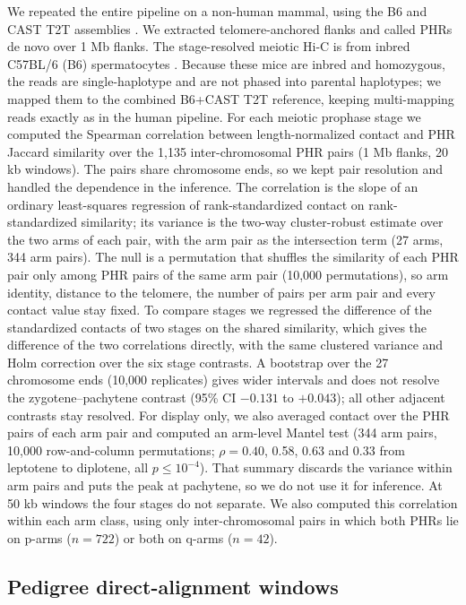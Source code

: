 \documentclass[pdflatex,mathphys]{jnl}
\begin{document}
We repeated the entire pipeline on a non-human mammal, using the B6 and CAST T2T
assemblies \cite{Francis2025}. We extracted telomere-anchored flanks and called PHRs de novo over 1 Mb flanks. The stage-resolved
meiotic Hi-C is from inbred C57BL/6 (B6) spermatocytes \cite{Zuo2021}. Because
these mice are inbred and homozygous, the reads are single-haplotype and are not
phased into parental haplotypes; we mapped them to the combined B6+CAST T2T
reference, keeping multi-mapping reads exactly as in the human pipeline. For each meiotic
prophase stage we computed the Spearman correlation between length-normalized contact and
PHR Jaccard similarity over the 1{,}135 inter-chromosomal PHR pairs (1 Mb flanks, 20 kb
windows). The pairs share chromosome ends, so we kept pair resolution and handled the
dependence in the inference. The correlation is the slope of an ordinary least-squares
regression of rank-standardized contact on rank-standardized similarity; its variance is the
two-way cluster-robust estimate \cite{Cameron2011multiway} over the two arms of each pair,
with the arm pair as the intersection term (27 arms, 344 arm pairs). The null is a
permutation that shuffles the similarity of each PHR pair only among PHR pairs of the same
arm pair (10,000 permutations), so arm identity, distance to the telomere, the number of
pairs per arm pair and every contact value stay fixed. To compare stages we regressed the
difference of the standardized contacts of two stages on the shared similarity, which gives
the difference of the two correlations directly, with the same clustered variance and Holm
correction over the six stage contrasts. A bootstrap over the 27 chromosome ends (10,000
replicates) gives wider intervals and does not resolve the zygotene--pachytene contrast
(95\% CI $-0.131$ to $+0.043$); all other adjacent contrasts stay resolved. For display only,
we also averaged contact over the PHR pairs of each arm pair and computed an arm-level Mantel
test (344 arm pairs, 10,000 row-and-column permutations; $\rho = 0.40$, 0.58, 0.63 and 0.33
from leptotene to diplotene, all $p \leq 10^{-4}$). That summary discards the variance within
arm pairs and puts the peak at pachytene, so we do not use it for inference. At 50 kb
windows the four stages do not separate.
We also computed this correlation within each arm class, using only
inter-chromosomal pairs in which both PHRs lie on p-arms ($n = 722$) or both on
q-arms ($n = 42$).

\subsection*{Pedigree direct-alignment windows}
\end{document}
